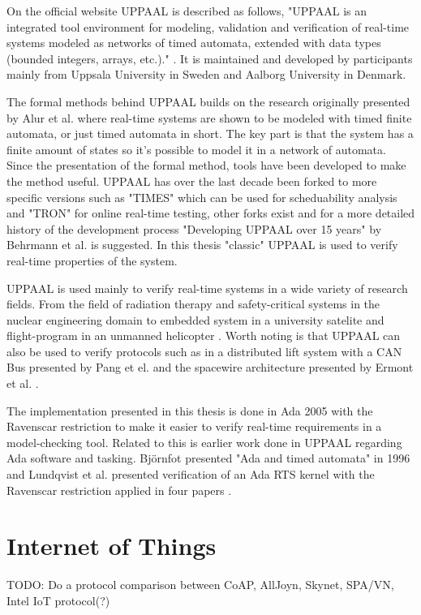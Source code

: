On the official website UPPAAL is described as follows, "UPPAAL is an
integrated tool environment for modeling, validation and verification of
real-time systems modeled as networks of timed automata, extended with data
types (bounded integers, arrays, etc.)." \cite{web:uppaal}. It is maintained
and developed by participants mainly from Uppsala University in Sweden and
Aalborg University in Denmark.

The formal methods behind UPPAAL builds on the research originally presented
by Alur et al. \cite{alur1994} where real-time systems are shown to be modeled
with timed finite automata, or just timed automata in short. The key part is
that the system has a finite amount of states so it's possible to model it in a
network of automata. Since the presentation of the formal method, tools have
been developed to make the method useful. UPPAAL has over the last decade been
forked to more specific versions such as "TIMES" which can be used for
scheduability analysis and "TRON" for online real-time testing, other forks
exist and for a more detailed history of the development process "Developing
UPPAAL over 15 years" by Behrmann et al.  \cite{behrmann2011} is suggested. In
this thesis "classic" UPPAAL is used to verify real-time properties of the
system.

UPPAAL is used mainly to verify real-time systems in a wide variety of research
fields. From the field of radiation therapy \cite{man2011} and safety-critical
systems in the nuclear engineering domain \cite{lahtinen2012} to embedded
system in a university satelite \cite{alencar2013} and flight-program in an
unmanned helicopter \cite{lee2011}. Worth noting is that UPPAAL can also be used
to verify protocols such as in a distributed lift system with a CAN Bus
presented by Pang et el. \cite{pang2003} and the spacewire architecture
presented by Ermont et al. \cite{ermont2013}.

The implementation presented in this thesis is done in Ada 2005 with the
Ravenscar restriction to make it easier to verify real-time requirements in a
model-checking tool. Related to this is earlier work done in UPPAAL regarding
Ada software and tasking. Bj\"{o}rnfot presented "Ada and timed automata" in
1996 \cite{bjornfot1996} and Lundqvist et al. presented verification of an Ada
RTS kernel with the Ravenscar restriction applied in four papers
\cite{lundqvist1999f,lundqvist1999g,lundqvist1999h,lundqvist2003}.

\section{Internet of Things} \label{sec:sota:internet_of_things}
TODO: Do a protocol comparison between CoAP, AllJoyn, Skynet, SPA/VN, Intel IoT
protocol(?)

